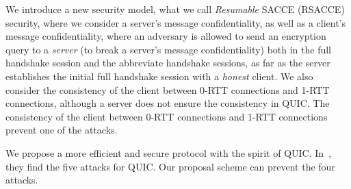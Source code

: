 We introduce a new
security model, what we call \textit{Resumable} SACCE
(RSACCE) security, where we consider a server's message
confidentiality, as well as a client's message
confidentiality, where an adversary is allowed to send
an encryption query to a \textit{server} (to break a
server's message confidentiality) both in the full
handshake session and the abbreviate handshake sessions,
as far as the server establishes the initial full
handshake session with a \textit{honest} client.
We also consider the consistency of the client between
0-RTT connections and 1-RTT connections, although a
server does not ensure the consistency in QUIC.
The consistency of the client between 0-RTT connections
and 1-RTT connections prevent one of the attacks.

We propose a more efficient and secure protocol with
the spirit of QUIC.
In~\cite{LJBN15:QUIC}, they find the five attacks for
QUIC.
Our proposal scheme can prevent the four attacks.